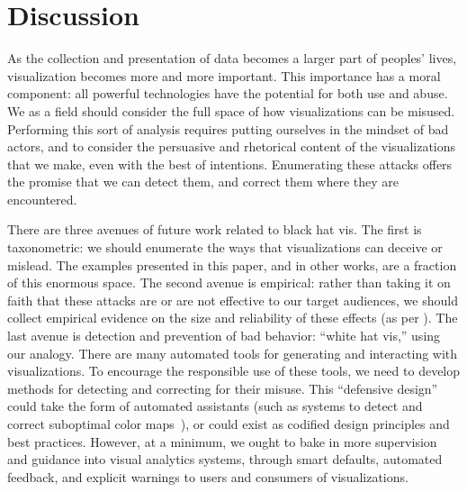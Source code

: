 \documentclass{vgtc}                          %
\begin{document}
\section{Discussion}

As the collection and presentation of data becomes a larger part of peoples' lives, visualization becomes more and more important. This importance has a moral component: all powerful technologies have the potential for both use and abuse. We as a field should consider the full space of how visualizations can be misused. Performing this sort of analysis requires putting ourselves in the mindset of bad actors, and to consider the persuasive and rhetorical content of the visualizations that we make, even with the best of intentions. Enumerating these attacks offers the promise that we can detect them, and correct them where they are encountered.

There are three avenues of future work related to black hat vis. The first is taxonometric: we should enumerate the ways that visualizations can deceive or mislead. The examples presented in this paper, and in other works, are a fraction of this enormous space. The second avenue is empirical: rather than taking it on faith that these attacks are or are not effective to our target audiences, we should collect empirical evidence on the size and reliability of these effects (as per \cite{boy2017showing,pandey2014persuasive}). The last avenue is detection and prevention of bad behavior: ``white hat vis,'' using our analogy. There are many automated tools for generating and interacting with visualizations. To encourage the responsible use of these tools, we need to develop methods for detecting and correcting for their misuse. This ``defensive design'' could take the form of automated assistants (such as systems to detect and correct suboptimal color maps~\cite{poco2018extracting}), or could exist as codified design principles and best practices. However, at a minimum, we ought to bake in more supervision and guidance into visual analytics systems, through smart defaults, automated feedback, and explicit warnings to users and consumers of visualizations.

%

%
%
%


\end{document}
